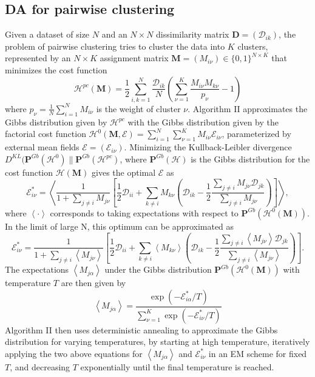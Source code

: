 \documentclass[9pt,parskip]{scrartcl}
\begin{document}
\begin{multicols*}{4}
\subsection*{DA for pairwise clustering}
Given a dataset of size $N$ and an $N \times N$ dissimilarity matrix $\mathbf{D} = (\mathcal{D}_{ik})$, the problem of pairwise clustering tries to cluster the data into $K$ clusters, represented by an $N \times K$ assignment matrix $\mathbf{M} = (M_{i\nu}) \in \{0,1\}^{N\times K}$ that minimizes the cost function
$$\mathcal{H}^{pc}(\mathbf{M}) = \frac{1}{2} \sum_{i,k=1}^N \frac{\mathcal{D}_{ik}}{N} \left(\sum_{\nu=1}^K \frac{M_{i\nu} M_{k\nu}}{p_\nu} - 1\right)$$
where $p_\nu = \frac{1}{N} \sum_{i=1}^N M_{i\nu}$ is the weight of cluster $\nu$. Algorithm II approximates the Gibbs distribution given by $\mathcal{H}^{pc}$ with the Gibbs distribution given by the factorial cost function $\mathcal{H}^{0}(\mathbf{M}, \mathcal{E}) = \sum_{i=1}^N \sum_{\nu=1}^K M_{i\nu} \mathcal{E}_{i\nu}$, parameterized by external mean fields $\mathcal{E} = (\mathcal{E}_{i\nu})$. Minimizing the Kullback-Leibler divergence $D^{KL}(\mathbf{P}^{Gb}(\mathcal{H}^0)\|\mathbf{P}^{Gb}(\mathcal{H}^{pc})$, where $\mathbf{P}^{Gb}(\mathcal{H})$ is the Gibbs distribution for the cost function $\mathcal{H}(\mathbf{M})$ gives the optimal $\mathcal{E}$ as 
$$\mathcal{E}^*_{i\nu} = \left\langle \frac{1}{1+\sum_{j \neq i} M_{j\nu}} \left[ \frac{1}{2} \mathcal{D}_{ii} + \sum_{k \neq i} M_{k\nu} \left( \mathcal{D}_{ik} - \frac{1}{2} \frac{\sum_{j \neq i} M_{j\nu} \mathcal{D}_{jk}}{\sum_{j \neq i} M_{j\nu}} \right) \right] \right\rangle,$$
where $\left\langle\cdot\right\rangle$ corresponds to taking expectations with respect to $\mathbf{P}^{Gb}(\mathcal{H}^0(\mathbf{M}))$. In the limit of large N, this optimum can be approximated as
$$\mathcal{E}^*_{i\nu} = \frac{1}{1+\sum_{j \neq i} \left\langle M_{j\nu} \right\rangle} \left[ \frac{1}{2} \mathcal{D}_{ii} + \sum_{k \neq i} \left\langle M_{k\nu} \right\rangle \left( \mathcal{D}_{ik} - \frac{1}{2} \frac{\sum_{j \neq i} \left\langle M_{j\nu} \right\rangle \mathcal{D}_{jk}}{\sum_{j \neq i} \left\langle M_{j\nu} \right\rangle} \right) \right].$$
The expectations $\left\langle M_{j\alpha} \right\rangle$ under the Gibbs distribution $\mathbf{P}^{Gb}(\mathcal{H}^0(\mathbf{M}))$ with temperature $T$ are then given by
$$\left\langle M_{j\alpha} \right\rangle = \frac{\exp(-\mathcal{E}^*_{i\alpha}/T)}{\sum_{\nu=1}^K \exp(-\mathcal{E}^*_{i\nu}/T)}$$
Algorithm II then uses deterministic annealing to approximate the Gibbs distribution for varying temperatures, by starting at high temperature, iteratively applying the two above equations for $\left\langle M_{j\alpha} \right\rangle$ and $\mathcal{E}^*_{i\nu}$ in an EM scheme for fixed $T$, and decreasing $T$ exponentially until the final temperature is reached. 


\end{multicols*}
\end{document}
